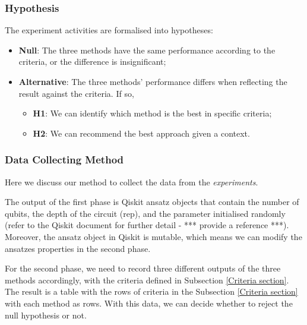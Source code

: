 \subsubsection{Hypothesis}
The experiment activities are formalised into hypotheses:
\begin{itemize}
    \item \textbf{Null}: The three methods have the same performance according to the criteria, or the difference is insignificant;
    \item \textbf{Alternative}: The three methods' performance differs when reflecting the result against the criteria. If so,
          \begin{itemize}
              \item \textbf{H1}: We can identify which method is the best in specific criteria;
              \item \textbf{H2}: We can recommend the best approach given a context.
          \end{itemize}
\end{itemize}

\subsubsection{Data Collecting Method}
\label{Data Collecting Section}
Here we discuss our method to collect the data from the \emph{experiments}.

The output of the first phase is Qiskit ansatz objects that contain the number of qubits, the depth of the circuit (rep), and the parameter initialised randomly (refer to the Qiskit document for further detail - *** provide a reference ***).
Moreover, the ansatz object in Qiskit is mutable, which means we can modify the ansatzes properties in the second phase.

For the second phase, we need to record three different outputs of the three methods accordingly, 
with the criteria defined in Subsection \ref{Criteria section}.
The result is a table with the rows of criteria in the Subsection \ref{Criteria section} with each method as rows.
With this data, we can decide whether to reject the null hypothesis or not.

